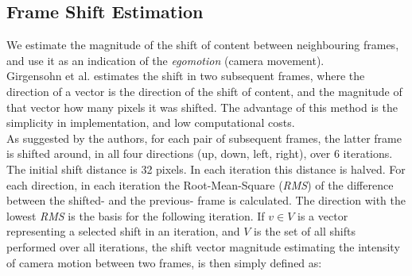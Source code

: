 \subsection{Frame Shift Estimation}\label{sec:frame_shift_estimation}
%
We estimate the magnitude of the shift of content between neighbouring frames, and use it as an indication of the \textit{egomotion} (camera movement).\\
Girgensohn et al.\cite{Girgensohn:2000:SAH:354401.354415} estimates the shift in two subsequent frames, where the direction of a vector is the direction of the shift of content, and the magnitude of that vector how many pixels it was shifted. The advantage of this method is the simplicity in implementation, and low computational costs.\\
As suggested by the authors, for each pair of subsequent frames, the latter frame is shifted around, in all four directions (up, down, left, right), over 6 iterations. The initial shift distance is 32 pixels. In each iteration this distance is halved. For each direction, in each iteration the Root-Mean-Square (\textit{RMS}) of the difference between the shifted- and the previous- frame is calculated. The direction with the lowest \textit{RMS} is the basis for the following iteration.
%
%
%
If $v \in V$ is a vector representing a selected shift in an iteration, and $V$ is the set of all shifts performed over all iterations, the shift vector magnitude estimating the intensity of camera motion between two frames, is then simply defined as:
